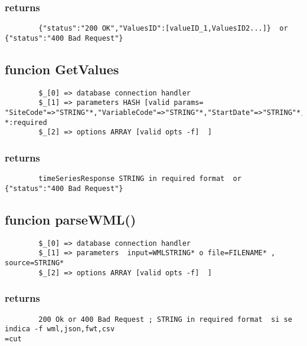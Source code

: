 \documentclass{article}
\begin{document}
\subsubsection*{returns\label{returns}}
\begin{verbatim}
        {"status":"200 OK","ValuesID":[valueID_1,ValuesID2...]}  or {"status":"400 Bad Request"}
\end{verbatim}
\subsection*{funcion GetValues\label{funcion_GetValues}}
\begin{verbatim}
        $_[0] => database connection handler
        $_[1] => parameters HASH [valid params=  "SiteCode"=>"STRING"*,"VariableCode"=>"STRING"*,"StartDate"=>"STRING"*,"EndDate"=>"STRING"*]    *:required
        $_[2] => options ARRAY [valid opts -f]  ]
\end{verbatim}
\subsubsection*{returns\label{returns}}
\begin{verbatim}
        timeSeriesResponse STRING in required format  or {"status":"400 Bad Request"}
\end{verbatim}
\subsection*{funcion parseWML()\label{funcion_parseWML_}}
\begin{verbatim}
        $_[0] => database connection handler
        $_[1] => parameters  input=WMLSTRING* o file=FILENAME* , source=STRING* 
        $_[2] => options ARRAY [valid opts -f]  ]
\end{verbatim}
\subsubsection*{returns\label{returns}}
\begin{verbatim}
        200 Ok or 400 Bad Request ; STRING in required format  si se indica -f wml,json,fwt,csv
=cut
\end{verbatim}
\end{document}
